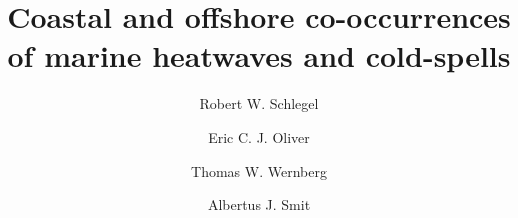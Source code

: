 \documentclass[a4paper,10pt,review]{elsarticle}
\begin{document}
\begin{frontmatter}

\title{Coastal and offshore co-occurrences of marine heatwaves and cold-spells}

\author[firstaddress]{Robert W. Schlegel}

\author[secondaddress,thirdaddress]{Eric C. J. Oliver}
\author[fourthaddress]{Thomas W. Wernberg}
\author[firstaddress]{Albertus J. Smit}


\address[firstaddress]{Department of Biodiversity and Conservation Biology, University of the Western Cape, Private Bag X17, Bellville 7535, South Africa}

\address[secondaddress]{ARC Centre of Excellence for Climate System Science, Australia}

\address[thirdaddress]{Institute for Marine and Antarctic Studies, University of Tasmania, Hobart, Australia}

\address[fourthaddress]{UWA Oceans Institute and School of Plant Biology, The University of Western Australia, Crawley, 6009 Western Australia, Australia}


\end{frontmatter}
\end{document}
